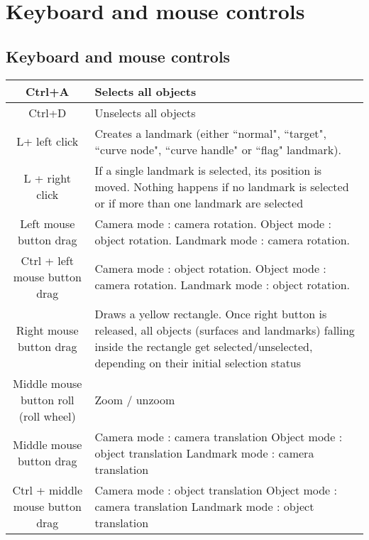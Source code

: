 \chapter{Keyboard and mouse controls}
\minitoc  

 \section{Keyboard and mouse controls}
\begin{tabularx}{\linewidth}{ | c | X | }
 \hline			
   Ctrl+A & Selects all objects \\ \hline				
   Ctrl+D & Unselects all objects \\ \hline				
   L+ left click & Creates a landmark (either ``normal", ``target", ``curve node", ``curve handle" or ``flag" landmark). \\ \hline			
L + right click & If a single landmark is selected, its position is
moved. Nothing happens if no landmark is selected
or if more than one landmark are selected \\ \hline			

Left mouse button drag 
& Camera mode : camera rotation.\newline
 Object mode : object rotation.\newline
Landmark mode : camera rotation. \\ \hline			

Ctrl + left mouse button drag 
& Camera mode : object rotation.\newline
 Object mode : camera rotation.\newline
 Landmark mode : object rotation. \\ \hline	
		
Right mouse button drag & Draws a yellow rectangle. Once right button is
released, all objects (surfaces and landmarks)
falling inside the rectangle get selected/unselected,
depending on their initial selection status \\ \hline	
		

Middle mouse button roll (roll wheel) & Zoom / unzoom \\ \hline		
	
Middle mouse button drag 
& Camera mode : camera translation\newline
 Object mode : object translation\newline
 Landmark mode : camera translation \\ \hline	
		
Ctrl + middle mouse button drag 
& Camera mode : object translation\newline
Object mode : camera translation\newline
Landmark mode : object translation \\ \hline			


\end{tabularx}
